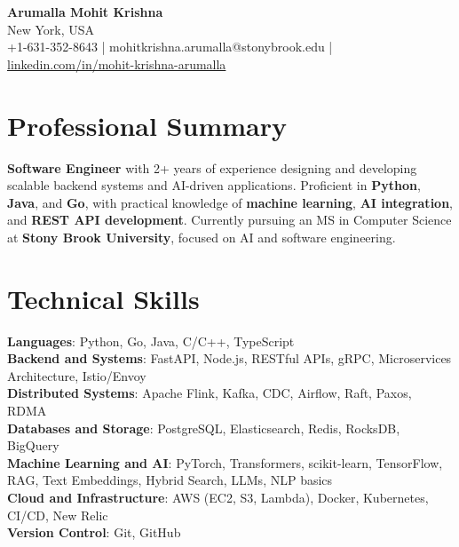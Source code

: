 \documentclass[letterpaper,11pt]{article}
\begin{document}
\begin{center}
  {\Large \textbf{Arumalla Mohit Krishna}} \\
  New York, USA \\
  +1-631-352-8643 \enspace | \enspace mohitkrishna.arumalla@stonybrook.edu \enspace | \enspace \href{https://www.linkedin.com/in/mohit-krishna-arumalla}{linkedin.com/in/mohit-krishna-arumalla}
\end{center}

\section{Professional Summary}
  \begin{itemize}[leftmargin=0.15in, label={}]
    \small{\item{
     \textbf{Software Engineer} with 2+ years of experience designing and developing scalable backend systems and AI-driven applications. Proficient in \textbf{Python}, \textbf{Java}, and \textbf{Go}, with practical knowledge of \textbf{machine learning}, \textbf{AI integration}, and \textbf{REST API development}. Currently pursuing an MS in Computer Science at \textbf{Stony Brook University}, focused on AI and software engineering.
    }}
  \end{itemize}
\vspace{-16pt}

\section{Technical Skills}
 \begin{itemize}[leftmargin=0.15in, label={}]
    \small{\item{
     \textbf{Languages}: Python, Go, Java, C/C++, TypeScript \\
     \textbf{Backend and Systems}: FastAPI, Node.js, RESTful APIs, gRPC, Microservices Architecture, Istio/Envoy \\
     \textbf{Distributed Systems}: Apache Flink, Kafka, CDC, Airflow, Raft, Paxos, RDMA \\
     \textbf{Databases and Storage}: PostgreSQL, Elasticsearch, Redis, RocksDB, BigQuery \\
     \textbf{Machine Learning and AI}: PyTorch, Transformers, scikit-learn, TensorFlow, RAG, Text Embeddings, Hybrid Search, LLMs, NLP basics \\
     \textbf{Cloud and Infrastructure}: AWS (EC2, S3, Lambda), Docker, Kubernetes, CI/CD, New Relic \\
     \textbf{Version Control}: Git, GitHub \\
    }}
 \end{itemize}
\vspace{-16pt}
\end{document}
